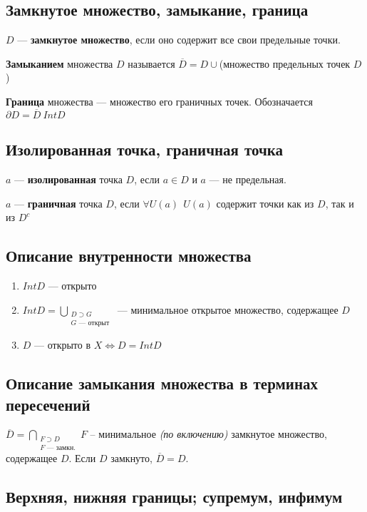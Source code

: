 \subsection{Замкнутое множество, замыкание, граница}

$D$ --- {\bf замкнутое множество}, если оно содержит все свои предельные точки.

{\bf Замыканием} множества $D$ называется $\overline D=D\cup$(множество предельных точек $D$)

{\bf Граница} множества --- множество его граничных точек. Обозначается $\partial D=\overline D\ Int D$

\subsection{Изолированная точка, граничная точка}

$a$ --- {\bf изолированная} точка $D$, если $a\in D$ и $a$ --- не предельная.

$a$ --- {\bf граничная} точка $D$, если $\forall U(a) \ \ U(a)$ содержит точки как из $D$, так и из $D^c$

\subsection{Описание внутренности множества}

\begin{enumerate}
    \item $Int D$ --- открыто
    \item $Int D = \bigcup\limits_{\substack{D\supset G \\ G\text{ --- открыт}}}$ --- минимальное открытое множество, содержащее $D$
    \item $D$ --- открыто в $X \Leftrightarrow D=Int D$
\end{enumerate}

\subsection{Описание замыкания множества в терминах пересечений}

$\overline D = \bigcap\limits_{\substack{F\supset D \\ F \text{ --- замкн.}}} F$ -- минимальное \textit{(по включению)} замкнутое множество, содержащее $D$. Если $D$ замкнуто, $\overline D=D$.

\subsection{Верхняя, нижняя границы; супремум, инфимум}

